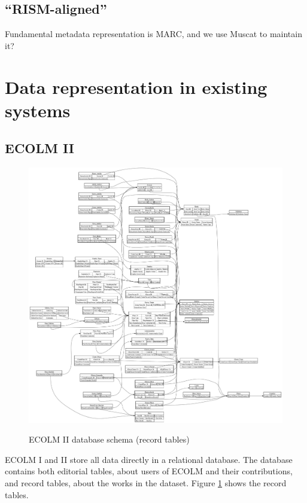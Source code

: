 \documentclass[sigconf, nonacm=true]{acmart}
\begin{document}
\begin{sloppypar}
  \subsection{``RISM-aligned''}

  Fundamental metadata representation is MARC, and we use Muscat to
  maintain it? 
  
  \clearpage

  \section{Data representation in existing systems}
  
  \subsection{ECOLM II}\label{ecolm-data}
  
  \begin{figure}[b]
  \centering
  \caption{ECOLM II database schema (record tables)}
  \includegraphics[width=\textwidth]{plot/records}
  \label{fig:records}
  \end{figure}

  ECOLM I and II store all data directly in a relational database. The
  database contains both editorial tables, about users of ECOLM and
  their contributions, and record tables, about the works in the
  dataset. Figure \ref{fig:records} shows the record tables.


\end{sloppypar}
\end{document}
